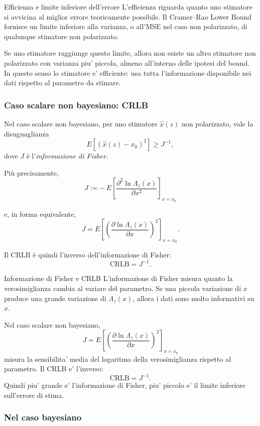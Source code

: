 \documentclass[11pt,a4paper]{article}
\begin{document}
\begin{spiegazione}{Efficienza e limite inferiore dell'errore}
L'efficienza riguarda quanto uno stimatore si avvicina al miglior errore teoricamente possibile. Il Cramer--Rao Lower Bound fornisce un limite inferiore alla varianza, o all'MSE nel caso non polarizzato, di qualunque stimatore non polarizzato.

Se uno stimatore raggiunge questo limite, allora non esiste un altro stimatore non polarizzato con varianza piu' piccola, almeno all'interno delle ipotesi del bound. In questo senso lo stimatore e' efficiente: usa tutta l'informazione disponibile nei dati rispetto al parametro da stimare.
\end{spiegazione}


\subsubsection*{Caso scalare non bayesiano: CRLB}

Nel caso scalare non bayesiano, per uno stimatore \(\hat x(z)\) non polarizzato, vale la disuguaglianza
\[
E\!\left[(\hat x(z)-x_0)^2\right]\geq J^{-1},
\]
dove \(J\) è l'\emph{informazione di Fisher}.

Più precisamente,
\[
J
:=
-\,E\!\left[
\frac{\partial^2 \ln \Lambda_z(x)}{\partial x^2}
\right]_{x=x_0}
\]

e, in forma equivalente,
\[
J
=
E\!\left[
\left(
\frac{\partial \ln \Lambda_z(x)}{\partial x}
\right)^2
\right]_{x=x_0}.
\]

Il \(\mathrm{CRLB}\) è quindi l'inverso dell'informazione di Fisher:
\[
\mathrm{CRLB}=J^{-1}.
\]

\begin{spiegazione}{Informazione di Fisher e CRLB}
L'informazione di Fisher misura quanto la verosimiglianza cambia al variare del parametro. Se una piccola variazione di $x$ produce una grande variazione di $\Lambda_z(x)$, allora i dati sono molto informativi su $x$.

Nel caso scalare non bayesiano,
\[
J
=
E\!\left[
\left(
\frac{\partial \ln \Lambda_z(x)}{\partial x}
\right)^2
\right]_{x=x_0}
\]
misura la sensibilita' media del logaritmo della verosimiglianza rispetto al parametro. Il CRLB e' l'inverso:
\[
\mathrm{CRLB}=J^{-1}.
\]
Quindi piu' grande e' l'informazione di Fisher, piu' piccolo e' il limite inferiore sull'errore di stima.
\end{spiegazione}

\subsubsection*{Nel caso bayesiano}
\end{document}
